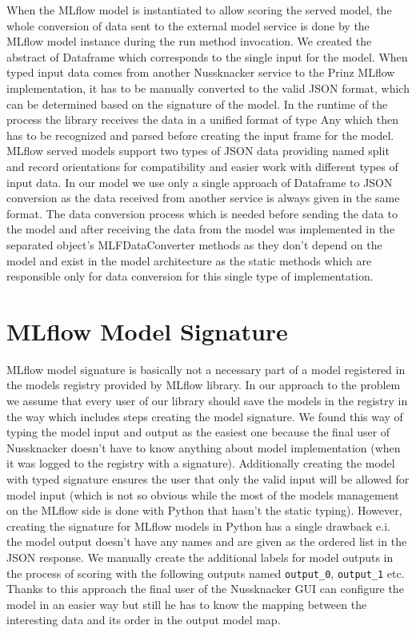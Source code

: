 When the MLflow model is instantiated to allow scoring the served model, the whole conversion of data
sent to the external model service is done by the MLflow model instance during the run method invocation.
We created the abstract of Dataframe which corresponds to the single input for the model. When typed input
data comes from another Nussknacker service to the Prinz MLflow implementation, it has to be manually
converted to the valid JSON format, which can be determined based on the signature of the model. In the
runtime of the process the library receives the data in a unified format of type Any which then has to
be recognized and parsed before creating the input frame for the model. MLflow served models support two
types of JSON data providing named split and record orientations for compatibility and easier work with
different types of input data. In our model we use only a single approach of Dataframe to JSON conversion
as the data received from another service is always given in the same format. The data conversion process
which is needed before sending the data to the model and after receiving the data from the model was
implemented in the separated object’s MLFDataConverter methods as they don’t depend on the model and
exist in the model architecture as the static methods which are responsible only for data conversion
for this single type of implementation.

\section{MLflow Model Signature}

MLflow model signature is basically not a necessary part of a model registered in the models registry
provided by MLflow library. In our approach to the problem we assume that every user of our library
should save the models in the registry in the way which includes steps creating the model signature.
We found this way of typing the model input and output as the easiest one because the final user of
Nussknacker doesn’t have to know anything about model implementation (when it was logged to the registry
with a signature). Additionally creating the model with typed signature ensures the user that only the
valid input will be allowed for model input (which is not so obvious while the most of the models management
on the MLflow side is done with Python that hasn’t the static typing). However, creating the signature
for MLflow models in Python has a single drawback e.i. the model output doesn’t have any names and are
given as the ordered list in the JSON response. We manually create the additional labels for model outputs
in the process of scoring with the following outputs named \texttt{output_0}, \texttt{output_1} etc. Thanks to this
approach the final user of the Nussknacker GUI can configure the model in an easier way but still he has
to know the mapping between the interesting data and its order in the output model map.


